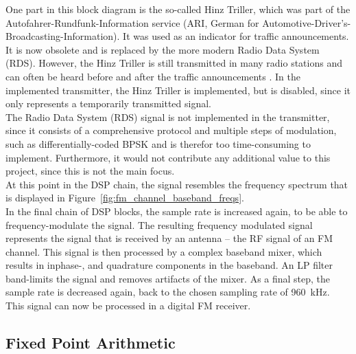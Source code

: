 One part in this block diagram is the so-called Hinz Triller, which was part of the Autofahrer-Rundfunk-Information service (ARI, German for Automotive-Driver's-Broadcasting-Information).
It was used as an indicator for traffic announcements.
It is now obsolete and is replaced by the more modern Radio Data System (RDS).
However, the Hinz Triller is still transmitted in many radio stations and can often be heard before and after the traffic announcements \cite{HinzTriller}.
In the implemented transmitter, the Hinz Triller is implemented, but is disabled, since it only represents a temporarily transmitted signal.\\

The Radio Data System (RDS) signal is not implemented in the transmitter, since it consists of a comprehensive protocol and multiple steps of modulation, such as differentially-coded BPSK \cite{IntroFmStereoRdsModulation} and is therefor too time-consuming to implement.
Furthermore, it would not contribute any additional value to this project, since this is not the main focus.\\

At this point in the DSP chain, the signal resembles the frequency spectrum that is displayed in Figure~\ref{fig:fm_channel_baseband_freqs}.\\

In the final chain of DSP blocks, the sample rate is increased again, to be able to frequency-modulate the signal.
The resulting frequency modulated signal represents the signal that is received by an antenna -- the RF signal of an FM channel.
This signal is then processed by a complex baseband mixer, which results in inphase-, and quadrature components in the baseband.
An LP filter band-limits the signal and removes artifacts of the mixer.
As a final step, the sample rate is decreased again, back to the chosen sampling rate of 960~kHz.
This signal can now be processed in a digital FM receiver.


\subsection{Fixed Point Arithmetic}

